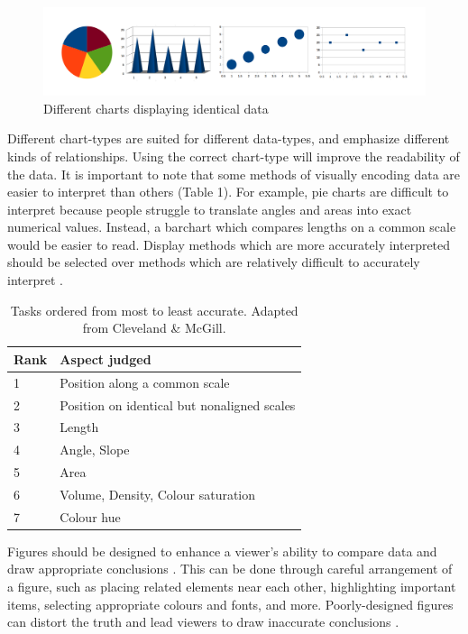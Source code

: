 \documentclass[letterpaper]{report}\usepackage[]{graphicx}\usepackage[]{color}
\begin{document}
\begin{figure}[!ht]
  \begin{center}
     \includegraphics[width=160mm]{Figures/intro_plotting_ex.png}
     \caption{Different charts displaying identical data}
  \end{center}
\end{figure}

Different chart-types are suited for different data-types, and emphasize different kinds of relationships. Using the correct chart-type will improve the readability of the data. It is important to note that some methods of visually encoding data are easier to interpret than others (Table 1). For example, pie charts are difficult to interpret because people struggle to translate angles and areas into exact numerical values. Instead, a barchart which compares lengths on a common scale would be easier to read. Display methods which are more accurately interpreted should be selected over methods which are relatively difficult to accurately interpret \cite{wong1, cleveland}. 

\begin{table}
\begin{center}
\begin{tabular}{ l  l }
\hline
Rank & Aspect judged\\
\hline
1 & Position along a common scale\\
2 & Position on identical but nonaligned scales\\
3 & Length \\
4 & Angle, Slope\\
5 & Area\\
6 & Volume, Density, Colour saturation\\
7 & Colour hue\\
\end{tabular}
\end{center}
\caption{Tasks ordered from most to least accurate. Adapted from Cleveland \& McGill.}
\end{table}

Figures should be designed to enhance a viewer's ability to compare data and draw appropriate conclusions \cite{tufte}. This can be done through careful arrangement of a figure, such as placing related elements near each other, highlighting important items, selecting appropriate colours and fonts, and more. Poorly-designed figures can distort the truth and lead viewers to draw inaccurate conclusions \cite{tufte}. 
\end{document}
